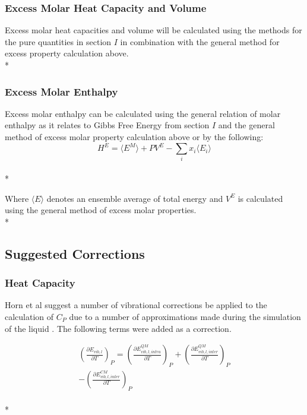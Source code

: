 \documentclass[9pt,bestpractices]{livecoms}
\begin{document}
\subsubsection{Excess Molar Heat Capacity and Volume}
Excess molar heat capacities and volume will be calculated using the  methods for the pure quantities in section $I$ in combination with the general method for excess property calculation above.\\*


\subsubsection{Excess Molar Enthalpy}
Excess molar enthalpy can be calculated using the general relation of molar enthalpy as it relates to Gibbs Free Energy from section $I$ and the general method of excess molar property calculation above or by the following\cite{hexcess}:
\begin{equation}H^E = \langle E^M \rangle + P V^E - \sum_{i} x_i \langle E_i \rangle\end{equation}\\*
 
Where $\langle E \rangle$ denotes an ensemble average of total energy and $V^E$ is calculated using the general method of excess molar properties.\\* 


\subsection{Suggested Corrections}
\subsubsection{Heat Capacity}
Horn et al suggest a number of vibrational corrections be applied to the calculation of $C_P$ due to a number of approximations made during the simulation of the liquid \cite{horn}. The following terms were added as a correction.

\begin{multline}
\left(\frac{\partial E_{vib,l}}{\partial T}\right)_{P} = \left(\frac{\partial E_{vib,l,intra}^{QM}}{\partial T}\right)_{P} + \left(\frac{\partial E_{vib,l,inter}^{QM}}{\partial T}\right)_{P} \\ - \left(\frac{\partial E_{vib,l,inter}^{CM}}{\partial T}\right)_{P}
\end{multline}\\*
\end{document}
